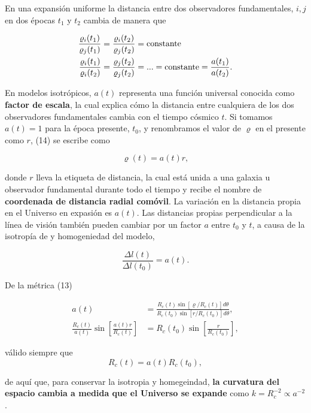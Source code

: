 \documentclass[11pt]{article}
\begin{document}
En una expansión uniforme la distancia entre dos observadores fundamentales, $i,j$ en dos épocas $t_1$ y $t_2$ cambia de manera que 

    \begin{align}
        \frac{\varrho_i(t_1)}{\varrho_j(t_1)} & = \frac{\varrho_i(t_2)}{\varrho_j(t_2)} = {\text{constante}} \notag \\
        \frac{\varrho_i(t_1)}{\varrho_i(t_2)} & = \frac{\varrho_j(t_2)}{\varrho_j(t_2)} = ... =  {\text{constante}} = \frac{a(t_1)}{a(t_2)}.
    \end{align}


En modelos isotrópicos, $a(t)$ representa una función universal conocida como {\bf{factor de escala}}, la cual explica cómo la distancia entre cualquiera de los dos observadores fundamentales cambia con el tiempo cósmico $t$. 
Si tomamos $a(t) = 1$ para la época presente, $t_0$, y renombramos el valor de $\varrho$ en el presente como $r$, (14) se escribe como

    \begin{equation}
        \varrho (t) = a(t)r,
    \end{equation}

donde $r$ lleva la etiqueta de distancia, la cual está unida a una galaxia u observador fundamental durante todo el tiempo y recibe el nombre de {\bf{coordenada de distancia radial comóvil}}. La variación en la distancia propia en el Universo en expasión es $a(t)$. Las distancias propias perpendicular a la línea de visión también pueden cambiar por un factor $a$ entre $t_0$ y $t$, a causa de la isotropía de y homogeniedad del modelo, 

\begin{equation}
    \frac{\Delta l(t)}{\Delta l(t_0)} = a(t).
\end{equation}

De la métrica (13) 

    \begin{align}
        a(t) & = \frac{R_c(t) \sin[\varrho/R_c(t)] d \theta}{R_c(t_0) \sin[r/R_c(t_0)] d \theta}, \\
    \frac{R_c(t)}{a(t)} \sin \left[\frac{a(t)r}{R_c(t)} \right] & = R_c(t_0) \sin \left[\frac{r}        {R_c(t_0)} \right],
    \end{align}

válido siempre que 
    \begin{equation}
        R_c (t) = a(t) R_c (t_0),
    \end{equation} 

de aquí que, para conservar la isotropia y homegeindad, {\bf{la curvatura del espacio cambia a medida que el Universo se expande}} como $k = R_c^{-2} \propto a^{-2}$. 
\end{document}
